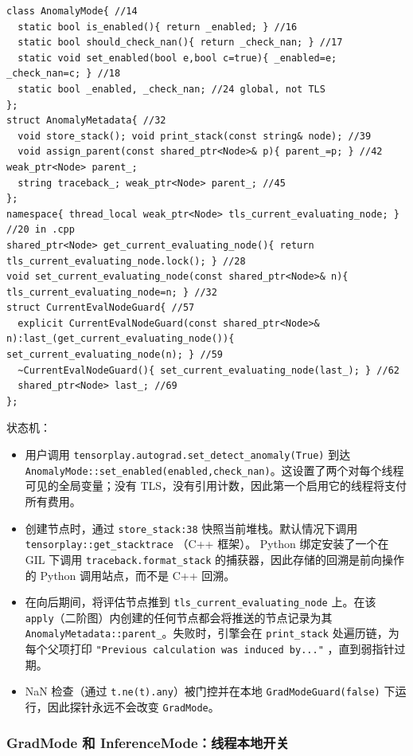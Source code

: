 \begin{lstlisting}[caption={and .}, label=lst:anomaly]
class AnomalyMode{ //14
  static bool is_enabled(){ return _enabled; } //16
  static bool should_check_nan(){ return _check_nan; } //17
  static void set_enabled(bool e,bool c=true){ _enabled=e; _check_nan=c; } //18
  static bool _enabled, _check_nan; //24 global, not TLS
};
struct AnomalyMetadata{ //32
  void store_stack(); void print_stack(const string& node); //39
  void assign_parent(const shared_ptr<Node>& p){ parent_=p; } //42 weak_ptr<Node> parent_;
  string traceback_; weak_ptr<Node> parent_; //45
};
namespace{ thread_local weak_ptr<Node> tls_current_evaluating_node; } //20 in .cpp
shared_ptr<Node> get_current_evaluating_node(){ return tls_current_evaluating_node.lock(); } //28
void set_current_evaluating_node(const shared_ptr<Node>& n){ tls_current_evaluating_node=n; } //32
struct CurrentEvalNodeGuard{ //57
  explicit CurrentEvalNodeGuard(const shared_ptr<Node>& n):last_(get_current_evaluating_node()){ set_current_evaluating_node(n); } //59
  ~CurrentEvalNodeGuard(){ set_current_evaluating_node(last_); } //62
  shared_ptr<Node> last_; //69
};
\end{lstlisting}

状态机：

\begin{itemize}[leftmargin=1.2em]
\item 用户调用 \texttt{tensorplay.autograd.set\_detect\_anomaly(True)} 到达 \texttt{AnomalyMode::set\_enabled(enabled,check\_nan)}。这设置了两个对每个线程可见的全局变量；没有 TLS，没有引用计数，因此第一个启用它的线程将支付所有费用。
\item 创建节点时，通过 \texttt{store\_stack:38} 快照当前堆栈。默认情况下调用 \texttt{tensorplay::get\_stacktrace} （C++ 框架）。 Python 绑定安装了一个在 GIL 下调用 \texttt{traceback.format\_stack} 的捕获器，因此存储的回溯是前向操作的 Python 调用站点，而不是 C++ 回溯。
\item 在向后期间，将评估节点推到 \texttt{tls\_current\_evaluating\_node} 上。在该 \texttt{apply}（二阶图）内创建的任何节点都会将推送的节点记录为其 \texttt{AnomalyMetadata::parent\_}。失败时，引擎会在 \texttt{print\_stack} 处遍历链，为每个父项打印 \texttt{"Previous calculation was induced by..."} ，直到弱指针过期。
\item NaN 检查（通过 \texttt{t.ne(t).any}）被门控并在本地 \texttt{GradModeGuard(false)} 下运行，因此探针永远不会改变 \texttt{GradMode}。
\end{itemize}

\subsubsection{GradMode 和 InferenceMode：线程本地开关}
\label{subsubsec:gradmode}

